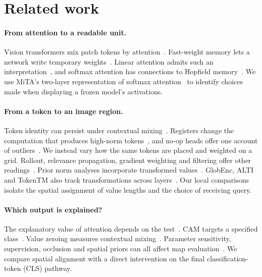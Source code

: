 \documentclass{article}
\begin{document}
\section{Related work}
\paragraph{From attention to a readable unit.} Vision transformers mix patch tokens by attention~\citep{dosovitskiy2021}. Fast-weight memory lets a network write temporary weights~\citep{schmidhuber1992}. Linear attention admits such an interpretation~\citep{schlag2021}, and softmax attention has connections to Hopfield memory~\citep{ramsauer2021}. We use MiTA's two-layer representation of softmax attention~\citep{wen2026mita} to identify choices made when displaying a frozen model's activations.

\paragraph{From a token to an image region.} Token identity can persist under contextual mixing~\citep{brunner2020,raghu2021}. Registers change the computation that produces high-norm tokens~\citep{darcet2024,jiang2025}, and no-op heads offer one account of outliers~\citep{bondarenko2023}. We instead vary how the same tokens are placed and weighted on a grid. Rollout, relevance propagation, gradient weighting and filtering offer other readings~\citep{abnar2020,chefer2021,chefer2021generic,ayyar2025}. Prior norm analyses incorporate transformed values~\citep{kobayashi2020,zhu2024}. GlobEnc, ALTI and TokenTM also track transformations across layers~\citep{modarressi2022,ferrando2022,wu2024tokentm}. Our local comparisons isolate the spatial assignment of value lengths and the choice of receiving query.

\paragraph{Which output is explained?} The explanatory value of attention depends on the test~\citep{jain2019,wiegreffe2019}. CAM targets a specified class~\citep{zhou2016}. Value zeroing measures contextual mixing~\citep{mohebbi2023}. Parameter sensitivity, supervision, occlusion and spatial priors can all affect map evaluation~\citep{adebayo2018,walmer2023,bluecher2024,kuang2026}. We compare spatial alignment with a direct intervention on the final classification-token (CLS) pathway.
\end{document}
